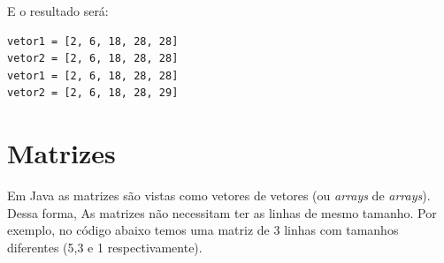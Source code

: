 \documentclass[
]{book}
\begin{document}
E o resultado será:

\begin{verbatim}
vetor1 = [2, 6, 18, 28, 28]
vetor2 = [2, 6, 18, 28, 28]
vetor1 = [2, 6, 18, 28, 28]
vetor2 = [2, 6, 18, 28, 29]
\end{verbatim}

\hypertarget{matrizes}{%
\section{Matrizes}\label{matrizes}}

Em Java as matrizes são vistas como vetores de vetores (ou \emph{arrays} de \emph{arrays}). Dessa forma, As matrizes não necessitam ter as linhas de mesmo tamanho. Por exemplo, no código abaixo temos uma matriz de 3 linhas com tamanhos diferentes (5,3 e 1 respectivamente).
\end{document}
